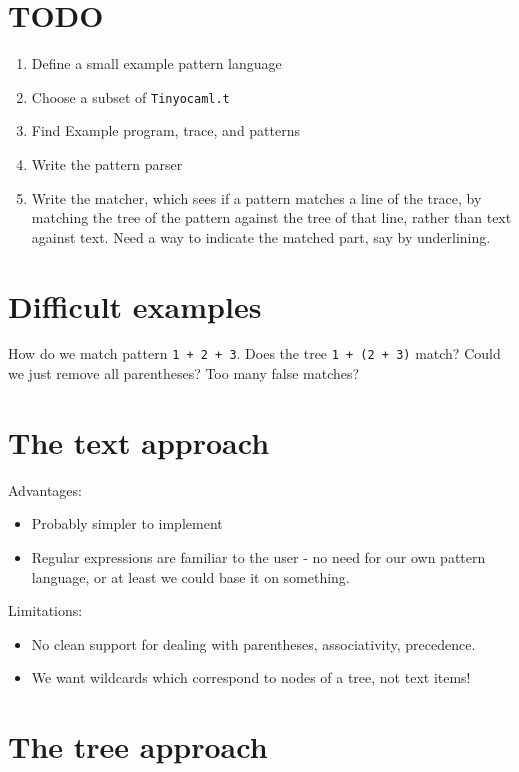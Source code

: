 \documentclass[10pt]{article}
\begin{document}
\section{TODO}

\begin{enumerate}
\item Define a small example pattern language
\item Choose a subset of \texttt{Tinyocaml.t}
\item Find Example program, trace, and patterns
\item Write the pattern parser
\item Write the matcher, which sees if a pattern matches a line of the trace, by matching the tree of the pattern against the tree of that line, rather than text against text. Need a way to indicate the matched part, say by underlining.
\end{enumerate}

\section{Difficult examples}

How do we match pattern \texttt{1 + 2 + 3}. Does the tree \texttt{1 + (2 + 3)} match? Could we just remove all parentheses? Too many false matches?

\section{The text approach}

Advantages:
\begin{itemize}
\item Probably simpler to implement
\item Regular expressions are familiar to the user - no need for our own pattern language, or at least we could base it on something.
\end{itemize}

\noindent Limitations:

\begin{itemize}
\item No clean support for dealing with parentheses, associativity, precedence.
\item We want wildcards which correspond to nodes of a tree, not text items!
\end{itemize}

\section{The tree approach}
\end{document}

